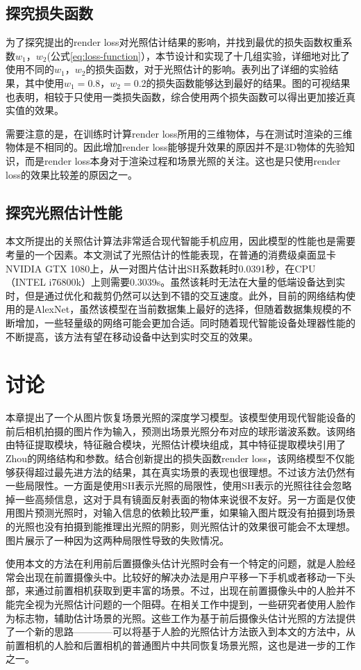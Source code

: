 \subsection{探究损失函数}
为了探究提出的render loss对光照估计结果的影响，并找到最优的损失函数权重系数$w_1$，$w_2$(公式\ref{eq:loss-function}），本节设计和实现了十几组实验，详细地对比了使用不同的$w_1$，$w_2$的损失函数，对于光照估计的影响。表列出了详细的实验结果，其中使用$w_1=0.8$，$w_2=0.2$的损失函数能够达到最好的结果。图的可视结果也表明，相较于只使用一类损失函数，综合使用两个损失函数可以得出更加接近真实值的效果。

需要注意的是，在训练时计算render loss所用的三维物体，与在测试时渲染的三维物体是不相同的。因此增加render loss能够提升效果的原因并不是3D物体的先验知识，而是render loss本身对于渲染过程和场景光照的关注。这也是只使用render loss的效果比较差的原因之一。
\subsection{探究光照估计性能}
本文所提出的关照估计算法非常适合现代智能手机应用，因此模型的性能也是需要考量的一个因素。本文测试了光照估计的性能表现，在普通的消费级桌面显卡NVIDIA GTX 1080上，从一对图片估计出SH系数耗时0.0391秒，在CPU（INTEL i76800k）上则需要0.3039s。虽然该耗时无法在大量的低端设备达到实时，但是通过优化和裁剪仍然可以达到不错的交互速度。此外，目前的网络结构使用的是AlexNet，虽然该模型在当前数据集上最好的选择，但随着数据集规模的不断增加，一些轻量级的网络可能会更加合适。同时随着现代智能设备处理器性能的不断提高，该方法有望在移动设备中达到实时交互的效果。
\section{讨论}
本章提出了一个从图片恢复场景光照的深度学习模型。该模型使用现代智能设备的前后相机拍摄的图片作为输入，预测出场景光照分布对应的球形谐波系数。该网络由特征提取模块，特征融合模块，光照估计模块组成，其中特征提取模块引用了Zhou\cite{zhou2017places}的网络结构和参数。结合创新提出的损失函数render loss，该网络模型不仅能够获得超过最先进方法的结果，其在真实场景的表现也很理想。不过该方法仍然有一些局限性。一方面是使用SH表示光照的局限性，使用SH表示的光照往往会忽略掉一些高频信息，这对于具有镜面反射表面的物体来说很不友好。另一方面是仅使用图片预测光照时，对输入信息的依赖比较严重，如果输入图片既没有拍摄到场景的光照也没有拍摄到能推理出光照的阴影，则光照估计的效果很可能会不太理想。图片展示了一种因为这两种局限性导致的失败情况。

使用本文的方法在利用前后置摄像头估计光照时会有一个特定的问题，就是人脸经常会出现在前置摄像头中。比较好的解决办法是用户平移一下手机或者移动一下头部，来通过前置相机获取到更丰富的场景。不过，出现在前置摄像头中的人脸并不能完全视为光照估计问题的一个阻碍。在相关工作中提到，一些研究者使用人脸作为标志物，辅助估计场景的光照。这些工作为基于前后摄像头估计光照的方法提供了一个新的思路————可以将基于人脸的光照估计方法嵌入到本文的方法中，从前置相机的人脸和后置相机的普通图片中共同恢复场景光照，这也是进一步的工作之一。
